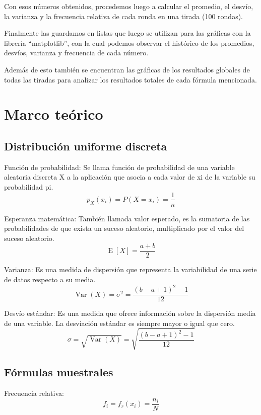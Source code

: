 Con esos números obtenidos, procedemos luego a calcular el promedio, el desvío, la varianza y la frecuencia relativa de cada ronda en una tirada (100 rondas).

Finalmente las guardamos en listas que luego se utilizan para las gráficas con la librería “matplotlib”, con la cual podemos observar el histórico de los promedios, desvíos, varianza y frecuencia de cada número.

Además de esto también se encuentran las gráficas de los resultados globales de todas las tiradas para analizar los resultados totales de cada fórmula mencionada.

\section{Marco teórico}
\subsection{Distribución uniforme discreta}
Función de probabilidad:
Se llama función de probabilidad de una variable aleatoria discreta X a la aplicación que asocia a cada valor de xi de la variable su probabilidad pi.
\begin{equation}
p_X(x_i) = P(X = x_i) = \frac{1}{n}
\end{equation}

Esperanza matemática:
También llamada valor esperado, es la sumatoria de las probabilidades de que exista un suceso aleatorio, multiplicado por el valor del suceso aleatorio.
\begin{equation}
\operatorname{E}[X] = \frac{a+b}{2}
\end{equation}

Varianza:
Es una medida de dispersión que representa la variabilidad de una serie de datos respecto a su media.
\begin{equation}
\operatorname{Var}(X) = \sigma^{2} = \frac{(b-a+1)^{2}-1}{12}
\end{equation}

Desvío estándar:
Es una medida que ofrece información sobre la dispersión media de una variable. La desviación estándar es siempre mayor o igual que cero.
\begin{equation}
\sigma = \sqrt{\operatorname{Var}(X)} = \sqrt{\frac{(b-a+1)^{2}-1}{12}}
\end{equation}

\subsection{Fórmulas muestrales}
Frecuencia relativa:
\begin{equation}
f_{i} = f_{r}(x_{i}) = \frac {n_{i}}{N}
\end{equation}

